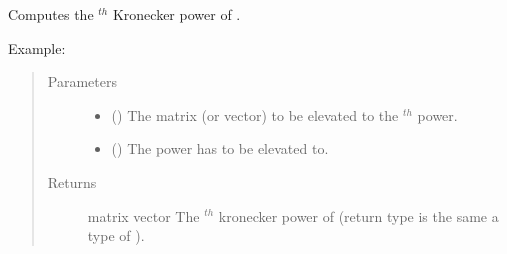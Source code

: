 \documentclass[letterpaper,10pt,english]{sphinxmanual}
\begin{document}

\begin{fulllineitems}
\label{\detokenize{run_circuit:run_circuit.kronecker_power}}
Computes the  \(^{th}\) Kronecker power of .
\begin{description}
\item[{Example:}] \leavevmode
{}%
\begin{sphinxVerbatim}[commandchars=\\\{\},formatcom=\footnotesize]
  \PYG{p}{[}\PYG{p}{[}\PYG{p}{]}\PYG{p}{[}\PYG{p}{]}\PYG{p}{]}
\end{sphinxVerbatim}

\end{description}
\begin{quote}\begin{description}
\item[{Parameters}] \leavevmode\begin{itemize}
\item {} 
 (\sphinxstyleliteralemphasis{\sphinxupquote{,}}) \textendash{} The matrix (or vector) to be elevated to the 
 \(^{th}\) power.

\item {} 
 () \textendash{} The power  has to be elevated to.

\end{itemize}

\item[{Returns}] \leavevmode
matrix  vector \textendash{} The  \(^{th}\) kronecker power of  
(return type is the same a type of ).

\end{description}\end{quote}

\end{fulllineitems}
\end{document}
